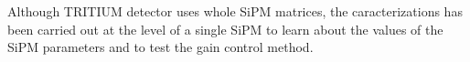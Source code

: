 Although TRITIUM detector uses whole SiPM matrices, the caracterizations has been carried out at the level of a single SiPM to learn about the values of the SiPM parameters and to test the gain control method.
 

